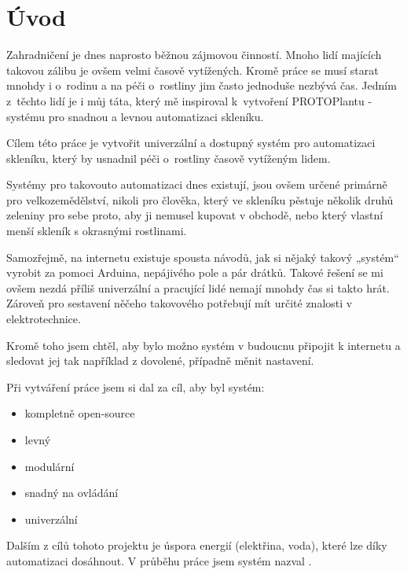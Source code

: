 \chapter*{Úvod}

Zahradničení je dnes naprosto běžnou zájmovou činností. Mnoho lidí majících takovou zálibu je ovšem velmi časově vytížených. Kromě práce se musí starat mnohdy i o~rodinu a na péči o~rostliny jim často jednoduše nezbývá čas. Jedním z~těchto lidí je i můj táta, který mě inspiroval k~vytvoření PROTOPlantu - systému pro snadnou a levnou automatizaci skleníku.

Cílem této práce je vytvořit univerzální a dostupný systém pro automatizaci skleníku, který by usnadnil péči o~rostliny časově vytíženým lidem. 

Systémy pro takovouto automatizaci dnes existují, jsou ovšem určené primárně pro velkozemědělství, nikoli pro člověka, který ve skleníku pěstuje několik druhů zeleniny pro sebe proto, aby ji nemusel kupovat v obchodě, nebo který vlastní menší skleník s okrasnými rostlinami. 

Samozřejmě, na internetu existuje spousta návodů, jak si nějaký takový „systém“ vyrobit za pomoci Arduina, nepájivého pole a pár drátků.
Takové řešení se mi ovšem nezdá příliš univerzální a pracující lidé nemají mnohdy čas si takto hrát.
Zároveň pro sestavení něčeho takovového potřebují mít určité znalosti v elektrotechnice.

Kromě toho jsem chtěl, aby bylo možno systém v budoucnu připojit k internetu a sledovat jej tak například z dovolené, případně měnit nastavení.

Při vytváření práce jsem si dal za cíl, aby byl systém:
\begin{itemize}
    \item kompletně open-source
    \item levný
    \item modulární
    \item snadný na ovládání
    \item univerzální
\end{itemize}

Dalším z cílů tohoto projektu je úspora energií (elektřina, voda), které lze díky automatizaci dosáhnout.
V průběhu práce jsem systém nazval .

\newpage
